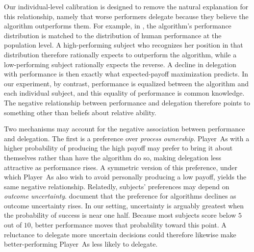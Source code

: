 Our individual-level calibration is designed to remove the natural explanation for this relationship, namely that worse performers delegate because they believe the algorithm outperforms them. For example, in \citet{feier_hiding_2022}, the algorithm's performance distribution is matched to the distribution of human performance at the population level. A high-performing subject who recognizes her position in that distribution therefore rationally expects to outperform the algorithm, while a low-performing subject rationally expects the reverse. A decline in delegation with performance is then exactly what expected-payoff maximization predicts. In our experiment, by contrast, performance is equalized between the algorithm and each individual subject, and this equality of performance is common knowledge. The negative relationship between performance and delegation therefore points to something other than beliefs about relative ability.%

Two mechanisms may account for the negative association between performance and delegation. The first is a preference over \textit{process ownership}. Player~As with a higher probability of producing the high payoff may prefer to bring it about themselves rather than have the algorithm do so, making delegation less attractive as performance rises. A symmetric version of this preference, under which Player~As also wish to avoid personally producing a low payoff, yields the same negative relationship. Relatedly, subjects' preferences may depend on \textit{outcome uncertainty}. \citet{dietvorst_people_2020} document that the preference for algorithms declines as outcome uncertainty rises. In our setting, uncertainty is arguably greatest when the probability of success is near one half. Because most subjects score below $5$ out of $10$, better performance moves that probability toward this point. %
A reluctance to delegate more uncertain decisions could therefore likewise make better-performing Player~As less likely to delegate.

